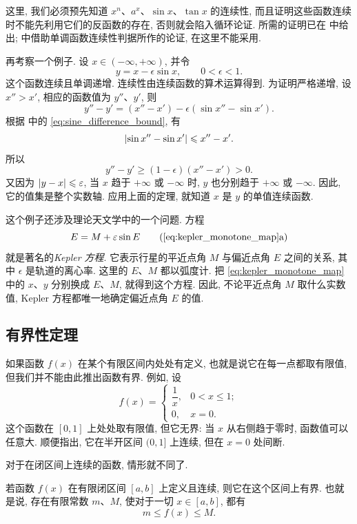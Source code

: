 这里, 我们必须预先知道 $x^n$、$a^x$、$\sin x$、$\tan x$ 的连续性,
而且证明这些函数连续时不能先利用它们的反函数的存在, 否则就会陷入循环论证.
所需的证明已在  中给出;
 中借助单调函数连续性判据所作的论证, 在这里不能采用.

再考察一个例子. 设 $x\in(-\infty,+\infty)$, 并令
\begin{equation}\label{eq:kepler_monotone_map}
y=x-\epsilon\sin x,\qquad 0<\epsilon<1.
\end{equation}
这个函数连续且单调递增.
连续性由连续函数的算术运算得到.
为证明严格递增, 设 $x''>x'$, 相应的函数值为 $y''$、$y'$, 则
$$
y''-y'=(x''-x')-\epsilon(\sin x''-\sin x').
$$
根据  中的 \eqref{eq:sine_difference_bound}, 有
$$
\left| \sin x''-\sin x' \right|\leqslant x''-x'.
$$
所以
$$
y''-y'\geq(1-\epsilon)(x''-x')>0.
$$
又因为 $\left| y-x \right|\leqslant\varepsilon$, 当 $x$ 趋于 $+\infty$ 或 $-\infty$ 时,
$y$ 也分别趋于 $+\infty$ 或 $-\infty$.
因此, 它的值集是整个实数轴.
应用上面的定理, 就知道 $x$ 是 $y$ 的单值连续函数.

这个例子还涉及理论天文学中的一个问题.
方程
\begin{equation}\label{eq:kepler_equation}
E=M+\epsilon\sin E
\tag{\ref*{eq:kepler_monotone_map}a}
\end{equation}
就是著名的\emph{Kepler 方程}.
它表示行星的平近点角 $M$ 与偏近点角 $E$ 之间的关系,
其中 $\epsilon$ 是轨道的离心率.
这里的 $E$、$M$ 都以弧度计.
把 \eqref{eq:kepler_monotone_map} 中的 $x$、$y$ 分别换成 $E$、$M$, 就得到这个方程.
因此, 不论平近点角 $M$ 取什么实数值, Kepler 方程都唯一地确定偏近点角 $E$ 的值.

\subsection{有界性定理}\label{subsec:84}
如果函数 $f(x)$ 在某个有限区间内处处有定义,
也就是说它在每一点都取有限值, 但我们并不能由此推出函数有界.
例如, 设
$$
f(x)=
\begin{cases}
    \dfrac1x, & 0<x\leq1; \\
    0, & x=0.
\end{cases}
$$
这个函数在 $[0,1]$ 上处处取有限值, 但它无界:
当 $x$ 从右侧趋于零时, 函数值可以任意大.
顺便指出, 它在半开区间 $(0,1]$ 上连续, 但在 $x=0$ 处间断.

对于在闭区间上连续的函数, 情形就不同了.

\begin{namedtheorem}\label{thm:weierstrass_boundedness}
若函数 $f(x)$ 在有限闭区间 $[a,b]$ 上定义且连续, 则它在这个区间上有界.
也就是说, 存在有限常数 $m$、$M$, 使对于一切 $x\in[a,b]$, 都有
$$
m\leq f(x)\leq M.
$$
\end{namedtheorem}

